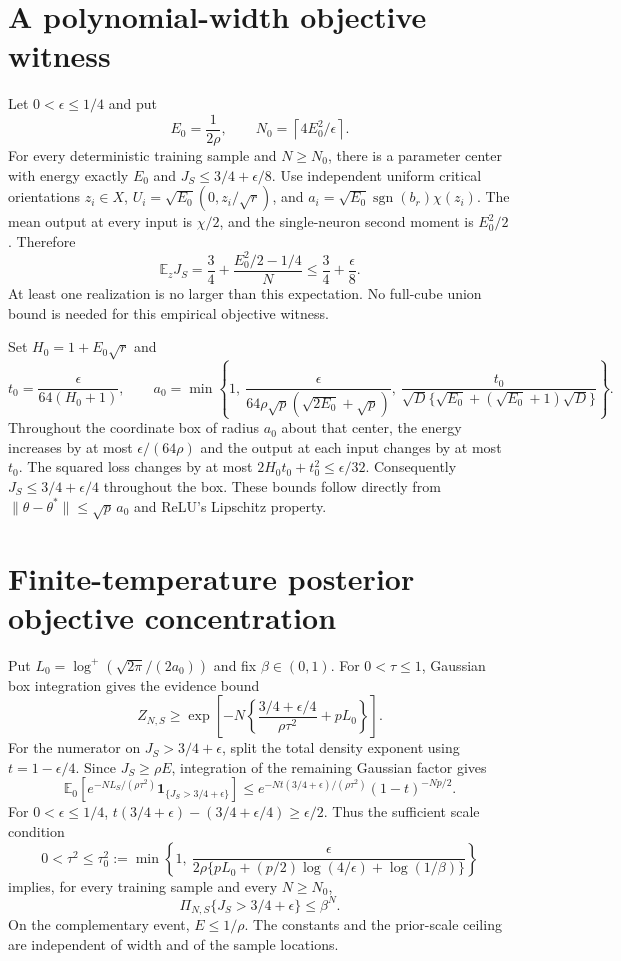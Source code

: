 \documentclass[11pt]{article}
\newcommand{\E}{\mathbb E}\newcommand{\R}{\mathbb R}
\begin{document}
\section{A polynomial-width objective witness}
Let $0<\epsilon\le1/4$ and put
\[
 E_0=\frac1{2\rho},\qquad
                 N_0=\left\lceil4E_0^2/\epsilon\right\rceil. \tag{5}
\]
For every deterministic training sample and $N\ge N_0$, there is a
parameter center with energy exactly $E_0$ and
$J_S\le3/4+\epsilon/8$.
Use independent uniform critical orientations $z_i\in X$,
$U_i=\sqrt{E_0}(0,z_i/\sqrt r)$, and
$a_i=\sqrt{E_0}\operatorname{sgn}(b_r)\chi(z_i)$.
The mean output at every input is $\chi/2$, and the single-neuron second
moment is $E_0^2/2$. Therefore
\[
 \E_zJ_S=\frac34+\frac{E_0^2/2-1/4}{N}
                    \le\frac34+\frac{\epsilon}{8}.
\]
At least one realization is no larger than this expectation.
No full-cube union bound is needed for this empirical objective witness.

Set $H_0=1+E_0\sqrt r$ and
\[
 t_0=\frac{\epsilon}{64(H_0+1)},\qquad
 a_0=\min\left\{1,\
 \frac{\epsilon}{64\rho\sqrt p(\sqrt{2E_0}+\sqrt p)},\
 \frac{t_0}{\sqrt D\{\sqrt{E_0}+(\sqrt{E_0}+1)\sqrt D\}}\right\}.
 \tag{6}
\]
Throughout the coordinate box of radius $a_0$ about that center,
the energy increases by at most $\epsilon/(64\rho)$ and the
output at each input changes by at most $t_0$.
The squared loss changes by at most
$2H_0t_0+t_0^2\le\epsilon/32$.
Consequently $J_S\le3/4+\epsilon/4$ throughout the box.
These bounds follow directly from
$\|\theta-\theta^*\|\le\sqrt p\,a_0$ and ReLU's Lipschitz property.

\section{Finite-temperature posterior objective concentration}
Put $L_0=\log^+(\sqrt{2\pi}/(2a_0))$ and fix $\beta\in(0,1)$.
For $0<\tau\le1$, Gaussian box integration gives the evidence bound
\[
 Z_{N,S}\ge
 \exp\left[-N\left\{\frac{3/4+\epsilon/4}{\rho\tau^2}
                                                  +pL_0\right\}\right].
 \tag{7}
\]
For the numerator on $J_S>3/4+\epsilon$, split the total density
exponent using $t=1-\epsilon/4$. Since $J_S\ge\rho E$,
integration of the remaining Gaussian factor gives
\[
 \E_0\left[e^{-N L_S/(\rho\tau^2)}
             \mathbf1_{\{J_S>3/4+\epsilon\}}\right]
 \le e^{-Nt(3/4+\epsilon)/(\rho\tau^2)}
                                      (1-t)^{-Np/2}.   \tag{8}
\]
For $0<\epsilon\le1/4$,
$t(3/4+\epsilon)-(3/4+\epsilon/4)\ge\epsilon/2$.
Thus the sufficient scale condition
\[
 0<\tau^2\le\tau_0^2:=
 \min\left\{1,\
 \frac{\epsilon}
 {2\rho\{pL_0+(p/2)\log(4/\epsilon)+\log(1/\beta)\}}\right\}
 \tag{9}
\]
implies, for every training sample and every $N\ge N_0$,
\[
                  \Pi_{N,S}\{J_S>3/4+\epsilon\}\le\beta^N.
 \tag{10}
\]
On the complementary event, $E\le1/\rho$.
The constants and the prior-scale ceiling are independent of width
and of the sample locations.
\end{document}

